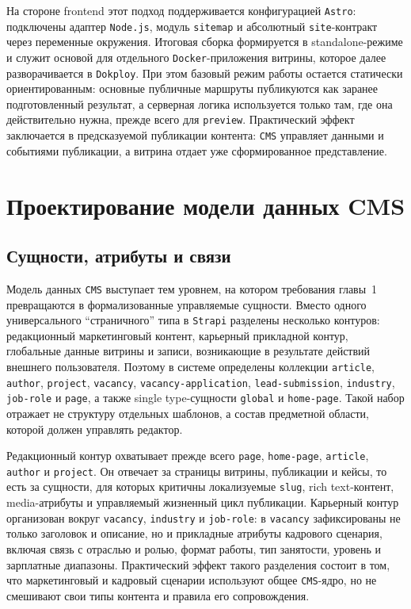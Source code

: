 На стороне frontend этот подход поддерживается конфигурацией \texttt{Astro}: подключены
адаптер \texttt{Node.js}, модуль \texttt{sitemap} и абсолютный \texttt{site}-контракт
через переменные окружения. Итоговая сборка формируется в standalone-режиме и служит
основой для отдельного \texttt{Docker}-приложения витрины, которое далее разворачивается
в \texttt{Dokploy}. При этом базовый режим работы остается статически ориентированным:
основные публичные маршруты публикуются как заранее подготовленный результат, а
серверная логика используется только там, где она действительно нужна, прежде всего
для \texttt{preview}. Практический эффект заключается в предсказуемой публикации
контента: \texttt{CMS} управляет данными и событиями публикации, а витрина отдает уже
сформированное представление.

\section{Проектирование модели данных CMS}

\subsection{Сущности, атрибуты и связи}

Модель данных \texttt{CMS} выступает тем уровнем, на котором требования главы~1
превращаются в формализованные управляемые сущности. Вместо одного универсального
``страничного'' типа в \texttt{Strapi} разделены несколько контуров: редакционный
маркетинговый контент, карьерный прикладной контур, глобальные данные витрины и записи,
возникающие в результате действий внешнего пользователя. Поэтому в системе определены
коллекции \texttt{article}, \texttt{author}, \texttt{project}, \texttt{vacancy},
\texttt{vacancy-application}, \texttt{lead-submission}, \texttt{industry},
\texttt{job-role} и \texttt{page}, а также single type-сущности \texttt{global} и
\texttt{home-page}. Такой набор отражает не структуру отдельных шаблонов, а состав
предметной области, которой должен управлять редактор.

Редакционный контур охватывает прежде всего \texttt{page}, \texttt{home-page},
\texttt{article}, \texttt{author} и \texttt{project}. Он отвечает за страницы витрины,
публикации и кейсы, то есть за сущности, для которых критичны локализуемые
\texttt{slug}, rich text-контент, media-атрибуты и управляемый жизненный цикл
публикации. Карьерный контур организован вокруг \texttt{vacancy}, \texttt{industry} и
\texttt{job-role}: в \texttt{vacancy} зафиксированы не только заголовок и описание, но
и прикладные атрибуты кадрового сценария, включая связь с отраслью и ролью, формат
работы, тип занятости, уровень и зарплатные диапазоны. Практический эффект такого
разделения состоит в том, что маркетинговый и кадровый сценарии используют общее
\texttt{CMS}-ядро, но не смешивают свои типы контента и правила его сопровождения.

